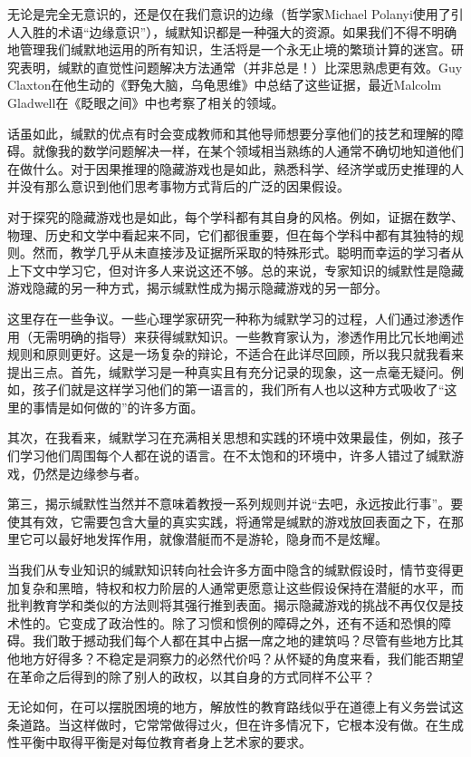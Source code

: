 无论是完全无意识的，还是仅在我们意识的边缘（哲学家Michael Polanyi使用了引人入胜的术语“边缘意识”），缄默知识都是一种强大的资源。如果我们不得不明确地管理我们缄默地运用的所有知识，生活将是一个永无止境的繁琐计算的迷宫。研究表明，缄默的直觉性问题解决方法通常（并非总是！）比深思熟虑更有效。Guy Claxton在他生动的《野兔大脑，乌龟思维》中总结了这些证据，最近Malcolm Gladwell在《眨眼之间》中也考察了相关的领域。

话虽如此，缄默的优点有时会变成教师和其他导师想要分享他们的技艺和理解的障碍。就像我的数学问题解决一样，在某个领域相当熟练的人通常不确切地知道他们在做什么。对于因果推理的隐藏游戏也是如此，熟悉科学、经济学或历史推理的人并没有那么意识到他们思考事物方式背后的广泛的因果假设。

对于探究的隐藏游戏也是如此，每个学科都有其自身的风格。例如，证据在数学、物理、历史和文学中看起来不同，它们都很重要，但在每个学科中都有其独特的规则。然而，教学几乎从未直接涉及证据所采取的特殊形式。聪明而幸运的学习者从上下文中学习它，但对许多人来说这还不够。总的来说，专家知识的缄默性是隐藏游戏隐藏的另一种方式，揭示缄默性成为揭示隐藏游戏的另一部分。

这里存在一些争议。一些心理学家研究一种称为缄默学习的过程，人们通过渗透作用（无需明确的指导）来获得缄默知识。一些教育家认为，渗透作用比冗长地阐述规则和原则更好。这是一场复杂的辩论，不适合在此详尽回顾，所以我只就我看来提出三点。首先，缄默学习是一种真实且有充分记录的现象，这一点毫无疑问。例如，孩子们就是这样学习他们的第一语言的，我们所有人也以这种方式吸收了“这里的事情是如何做的”的许多方面。

其次，在我看来，缄默学习在充满相关思想和实践的环境中效果最佳，例如，孩子们学习他们周围每个人都在说的语言。在不太饱和的环境中，许多人错过了缄默游戏，仍然是边缘参与者。

第三，揭示缄默性当然并不意味着教授一系列规则并说“去吧，永远按此行事”。要使其有效，它需要包含大量的真实实践，将通常是缄默的游戏放回表面之下，在那里它可以最好地发挥作用，就像潜艇而不是游轮，隐身而不是炫耀。

当我们从专业知识的缄默知识转向社会许多方面中隐含的缄默假设时，情节变得更加复杂和黑暗，特权和权力阶层的人通常更愿意让这些假设保持在潜艇的水平，而批判教育学和类似的方法则将其强行推到表面。揭示隐藏游戏的挑战不再仅仅是技术性的。它变成了政治性的。除了习惯和惯例的障碍之外，还有不适和恐惧的障碍。我们敢于撼动我们每个人都在其中占据一席之地的建筑吗？尽管有些地方比其他地方好得多？不稳定是洞察力的必然代价吗？从怀疑的角度来看，我们能否期望在革命之后得到的除了别人的政权，以其自身的方式同样不公平？

无论如何，在可以摆脱困境的地方，解放性的教育路线似乎在道德上有义务尝试这条道路。当这样做时，它常常做得过火，但在许多情况下，它根本没有做。在生成性平衡中取得平衡是对每位教育者身上艺术家的要求。

